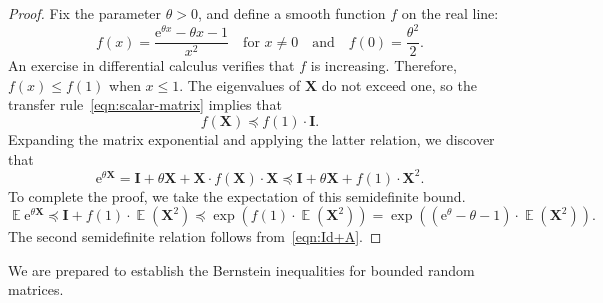 \documentclass[11pt,letterpaper,twoside,reqno,draft]{amsart}
\theoremstyle{remark}
\numberwithin{equation}{section}
\numberwithin{thm}{section}
\begin{document}
\begin{proof}
Fix the parameter $\theta > 0$, and define a smooth function $f$ on the real line:
$$
f(x) = \frac{{\mathrm{e}}^{\theta x} - \theta x - 1}{x^2}
\quad\text{for $x \neq 0$}\quad\text{and}\quad
f(0) = \frac{\theta^2}{2}.
$$
An exercise in differential calculus verifies that $f$ is increasing.  Therefore, $f(x) \leq f(1)$ when $x \leq 1$.  The eigenvalues of ${\bm{{X}}}$ do not exceed one, so the transfer rule~\eqref{eqn:scalar-matrix} implies that
$$
f({\bm{{X}}}) {\preccurlyeq} f(1) \cdot {\mathbf{I}}.
$$
Expanding the matrix exponential and applying the latter relation, we discover that
$$
{\mathrm{e}}^{\theta {\bm{{X}}}}
	= {\mathbf{I}} + \theta {\bm{{X}}} + {\bm{{X}}} \cdot f({\bm{{X}}}) \cdot {\bm{{X}}}
	{\preccurlyeq} {\mathbf{I}} + \theta {\bm{{X}}} + f(1) \cdot {\bm{{X}}}^2.
$$
To complete the proof, we take the expectation of this semidefinite bound.
$$
{\operatorname{\mathbb{E}}} {\mathrm{e}}^{\theta {\bm{{X}}}}
	{\preccurlyeq} {\mathbf{I}} + f(1) \cdot {\operatorname{\mathbb{E}}}( {\bm{{X}}}^2 )
	{\preccurlyeq} \exp\left( f(1) \cdot {\operatorname{\mathbb{E}}}( {\bm{{X}}}^2 ) \right)
	= \exp\left( ({\mathrm{e}}^\theta - \theta - 1) \cdot {\operatorname{\mathbb{E}}}({\bm{{X}}}^2) \right).
$$
The second semidefinite relation follows from~\eqref{eqn:Id+A}.  
\end{proof}

We are prepared to establish the Bernstein inequalities for bounded random matrices.
\end{document}
